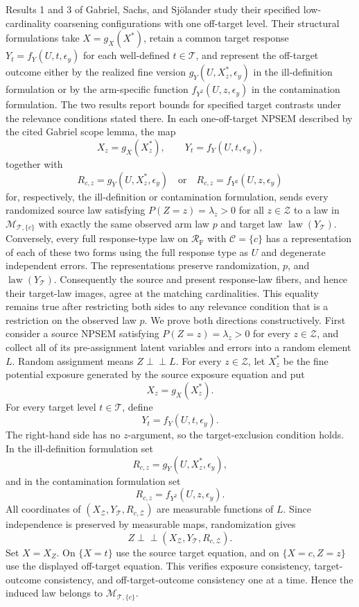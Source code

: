 Results 1 and 3 of Gabriel, Sachs, and Sj\"olander study their specified low-cardinality coarsening configurations with one off-target level.  Their structural formulations take \(X=g_X(X^*)\), retain a common target response \(Y_t=f_Y(U,t,\epsilon_y)\) for each well-defined \(t\in\mathcal T\), and represent the off-target outcome either by the realized fine version \(g_Y(U,X_z^*,\epsilon_y)\) in the ill-definition formulation or by the arm-specific function \(f_{Y^2}(U,z,\epsilon_y)\) in the contamination formulation.  The two results report bounds for specified target contrasts under the relevance conditions stated there.
In each one-off-target NPSEM described by the cited Gabriel scope lemma, the map
\[
 X_z=g_X(X_z^*),\qquad
 Y_t=f_Y(U,t,\epsilon_y),
\]
together with
\[
 R_{c,z}=g_Y(U,X_z^*,\epsilon_y)
 \quad\text{or}\quad
 R_{c,z}=f_{Y^2}(U,z,\epsilon_y)
\]
for, respectively, the ill-definition or contamination formulation, sends every randomized source law satisfying \(P(Z=z)=\lambda_z>0\) for all \(z\in\mathcal Z\) to a law in \(\mathcal M_{\mathcal T,\{c\}}\) with exactly the same observed arm law \(p\) and target law \(\operatorname{law}(Y_{\mathcal T})\).  Conversely, every full response-type law on \(\mathcal R_{\mathrm F}\) with \(\mathcal C=\{c\}\) has a representation of each of these two forms using the full response type as \(U\) and degenerate independent errors.  The representations preserve randomization, \(p\), and \(\operatorname{law}(Y_{\mathcal T})\).  Consequently the source and present response-law fibers, and hence their target-law images, agree at the matching cardinalities.  This equality remains true after restricting both sides to any relevance condition that is a restriction on the observed law \(p\).
We prove both directions constructively.  First consider a source NPSEM satisfying \(P(Z=z)=\lambda_z>0\) for every \(z\in\mathcal Z\), and collect all of its pre-assignment latent variables and errors into a random element \(L\).  Random assignment means \(Z\perp\!\!\!\perp L\).  For every \(z\in\mathcal Z\), let \(X_z^*\) be the fine potential exposure generated by the source exposure equation and put
\[
X_z=g_X(X_z^*).
\]
For every target level \(t\in\mathcal T\), define
\[
Y_t=f_Y(U,t,\epsilon_y).
\]
The right-hand side has no \(z\)-argument, so the target-exclusion condition holds.  In the ill-definition formulation set
\[
R_{c,z}=g_Y(U,X_z^*,\epsilon_y),
\]
and in the contamination formulation set
\[
R_{c,z}=f_{Y^2}(U,z,\epsilon_y).
\]
All coordinates of \((X_{\mathcal Z},Y_{\mathcal T},R_{c,\mathcal Z})\) are measurable functions of \(L\).  Since independence is preserved by measurable maps, randomization gives
\[
Z\perp\!\!\!\perp(X_{\mathcal Z},Y_{\mathcal T},R_{c,\mathcal Z}).
\]
Set \(X=X_Z\).  On \(\{X=t\}\) use the source target equation, and on \(\{X=c,Z=z\}\) use the displayed off-target equation.  This verifies exposure consistency, target-outcome consistency, and off-target-outcome consistency one at a time.  Hence the induced law belongs to \(\mathcal M_{\mathcal T,\{c\}}\).

